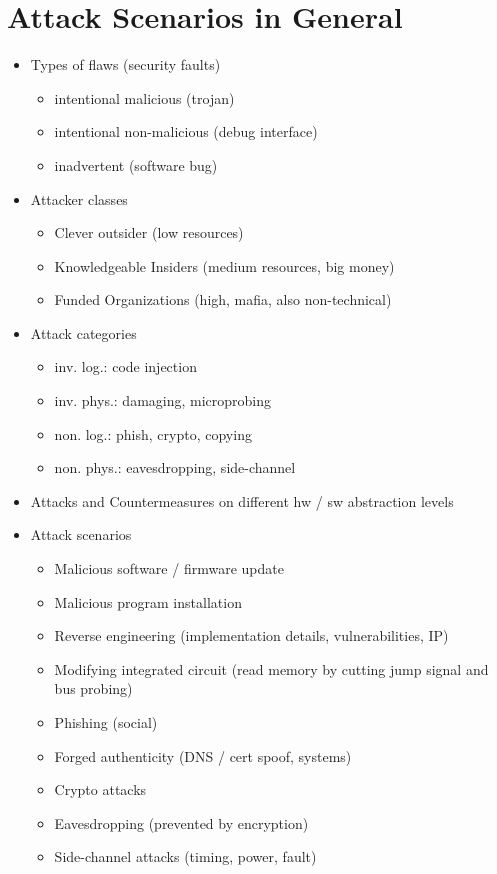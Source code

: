 \documentclass[11pt, paper=a4, twocolumn]{scrartcl}
\begin{document}
	\section{Attack Scenarios in General}
		\begin{itemize}
			\item Types of flaws (security faults)
				\begin{itemize}
					\item intentional malicious (trojan)
					\item intentional non-malicious (debug interface)
					\item inadvertent (software bug)
				\end{itemize}
			\item Attacker classes
				\begin{itemize}
					\item Clever outsider (low resources)
					\item Knowledgeable Insiders (medium resources, big money)
					\item Funded Organizations (high, mafia, also non-technical)
				\end{itemize}
			\item Attack categories
				\begin{itemize}
					\item inv. log.: code injection
					\item inv. phys.: damaging, microprobing
					\item non. log.: phish, crypto, copying
					\item non. phys.: eavesdropping, side-channel
				\end{itemize}
			\item Attacks and Countermeasures on different hw / sw abstraction levels
			\item Attack scenarios
				\begin{itemize}
					\item Malicious software / firmware update
					\item Malicious program installation
					\item Reverse engineering (implementation details, vulnerabilities, IP)
					\item Modifying integrated circuit (read memory by cutting jump signal and bus probing)
					\item Phishing (social)
					\item Forged authenticity (DNS / cert spoof, systems)
					\item Crypto attacks
					\item Eavesdropping (prevented by encryption)
					\item Side-channel attacks (timing, power, fault)
				\end{itemize}
		\end{itemize}
\end{document}
